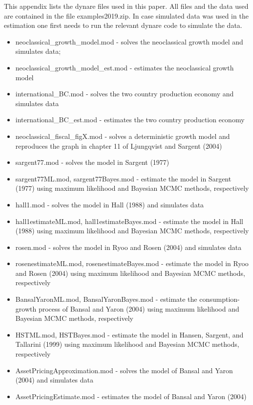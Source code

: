\documentclass[a4paper,12pt]{scrartcl} %
\begin{document}
This appendix lists the dynare files used in this paper. All files and the data used are contained in the file examples2019.zip. In case simulated data was used in the estimation one first needs to run the relevant dynare code to simulate the data.
\begin{itemize}
  \item neoclassical\_growth\_model.mod - solves the neoclassical growth model and simulates data;
\item neoclassical\_growth\_model\_est.mod - estimates the neoclassical growth model
\item international\_BC.mod - solves the two country production economy and simulates data
\item international\_BC\_est.mod - estimates the two country production economy
\item neoclassical\_fiscal\_figX.mod - solves a deterministic growth model and reproduces the graph in chapter 11 of Ljungqvist and Sargent (2004)
\item sargent77.mod - solves the model in Sargent (1977)
\item sargent77ML.mod, sargent77Bayes.mod - estimate the model in Sargent (1977) using maximum likelihood and Bayesian MCMC methods, respectively
\item hall1.mod - solves the model in Hall (1988) and simulates data
\item hall1estimateML.mod, hall1estimateBayes.mod - estimate the model in Hall (1988) using maximum likelihood and Bayesian MCMC methods, respectively
\item rosen.mod - solves the model in Ryoo and Rosen (2004) and simulates data
  \item rosenestimateML.mod, rosenestimateBayes.mod - estimate the model in Ryoo and Rosen (2004) using maximum likelihood and Bayesian MCMC methods, respectively
\item BansalYaronML.mod, BansalYaronBayes.mod - estimate the consumption-growth process of Bansal and Yaron (2004) using maximum likelihood and Bayesian MCMC methods, respectively
\item HSTML.mod, HSTBayes.mod - estimate the model in Hansen, Sargent, and Tallarini (1999) using maximum likelihood and Bayesian MCMC methods, respectively
\item AssetPricingApproximation.mod - solves the model of Bansal and Yaron (2004) and simulates data
\item AssetPricingEstimate.mod - estimates the model of Bansal and Yaron (2004)
\end{itemize}
\end{document}
